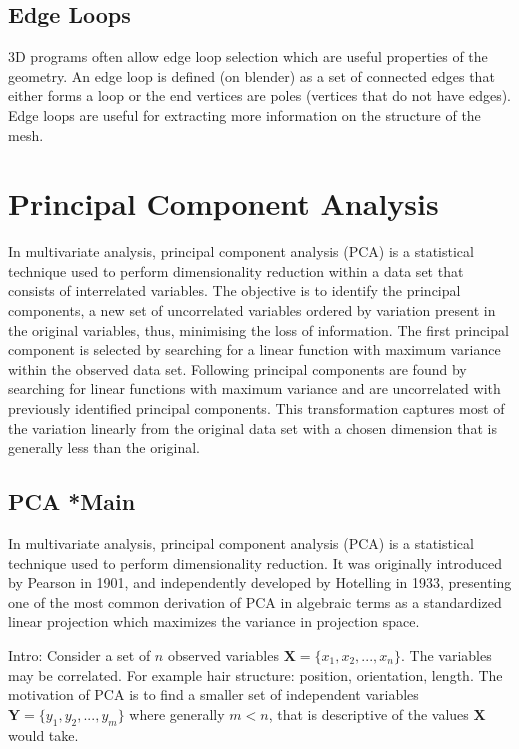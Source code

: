 \documentclass[ %
                    author={Dillon Keith Diep},
                supervisor={Dr. Carl Henrik Ek},
                    degree={MEng},
                     title={Assisted Content Generation for 3D Hair Geometry},
                  subtitle={[INCOMPLETE DRAFT, CONTAINS NOTES FROM RESEARCH]},
                      type={Research},
                      year={2014} ]{dissertation}
\begin{document}
\subsection{Edge Loops}
3D programs often allow edge loop selection which are useful properties of the geometry. An edge loop is defined (on blender) as a set of connected edges that either forms a loop or the end vertices are poles (vertices that do not have edges). Edge loops are useful for extracting more information on the structure of the mesh.
\cite{edgeloops}

\section{Principal Component Analysis}
In multivariate analysis, principal component analysis (PCA) is a statistical technique used to perform dimensionality reduction within a data set that consists of interrelated variables.
The objective is to identify the principal components, a new set of uncorrelated variables ordered by variation present in the original variables, thus, minimising the loss of information.\cite{pca2002}
The first principal component is selected by searching for a linear function with maximum variance within the observed data set.
Following principal components are found by searching for linear functions with maximum variance and are uncorrelated with previously identified principal components.
This transformation captures most of the variation linearly from the original data set with a chosen dimension that is generally less than the original.

\subsection{PCA *Main}
In multivariate analysis, principal component analysis (PCA) is a statistical technique used to perform dimensionality reduction. It was originally introduced by Pearson in 1901\cite{pca1901}, and independently developed by Hotelling\cite{pca1933} in 1933, presenting one of the most common derivation of PCA in algebraic terms as a standardized linear projection which maximizes the variance in projection space.

Intro: Consider a set of $n$ observed variables $\mathbf{X}=\{x_1,x_2,...,x_n\}$. The variables may be correlated. For example hair structure: position, orientation, length. The motivation of PCA is to find a smaller set of independent variables $\mathbf{Y}=\{y_1,y_2,...,y_m\}$ where generally $m<n$, that is descriptive of the values $\mathbf{X}$ would take.
\end{document}
